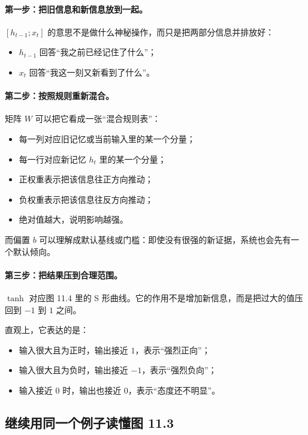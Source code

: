 \documentclass[12pt,a4paper]{ctexart}
\begin{document}
\paragraph{第一步：把旧信息和新信息放到一起。}
\([h_{t-1};x_t]\) 的意思不是做什么神秘操作，而只是把两部分信息并排放好：
\begin{itemize}
  \item \(h_{t-1}\) 回答“我之前已经记住了什么”；
  \item \(x_t\) 回答“我这一刻又新看到了什么”。
\end{itemize}

\paragraph{第二步：按照规则重新混合。}
矩阵 \(W\) 可以把它看成一张“混合规则表”：
\begin{itemize}
  \item 每一列对应旧记忆或当前输入里的某一个分量；
  \item 每一行对应新记忆 \(h_t\) 里的某一个分量；
  \item 正权重表示把该信息往正方向推动；
  \item 负权重表示把该信息往反方向推动；
  \item 绝对值越大，说明影响越强。
\end{itemize}

而偏置 \(b\) 可以理解成默认基线或门槛：即使没有很强的新证据，系统也会先有一个默认倾向。

\paragraph{第三步：把结果压到合理范围。}
\(\tanh\) 对应图 11.4 里的 S 形曲线。它的作用不是增加新信息，而是把过大的值压回到 \(-1\) 到 \(1\) 之间。

直观上，它表达的是：
\begin{itemize}
  \item 输入很大且为正时，输出接近 \(1\)，表示“强烈正向”；
  \item 输入很大且为负时，输出接近 \(-1\)，表示“强烈负向”；
  \item 输入接近 \(0\) 时，输出也接近 \(0\)，表示“态度还不明显”。
\end{itemize}

\subsection{继续用同一个例子读懂图 11.3}
\end{document}
